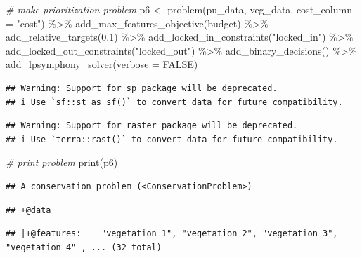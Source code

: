 \documentclass[
  12pt,
]{book}
\newenvironment{Shaded}{\begin{snugshade}}{\end{snugshade}}
\newcommand{\AttributeTok}[1]{\textcolor[rgb]{0.77,0.63,0.00}{#1}}
\newcommand{\CommentTok}[1]{\textcolor[rgb]{0.56,0.35,0.01}{\textit{#1}}}
\newcommand{\ConstantTok}[1]{\textcolor[rgb]{0.00,0.00,0.00}{#1}}
\newcommand{\FloatTok}[1]{\textcolor[rgb]{0.00,0.00,0.81}{#1}}
\newcommand{\FunctionTok}[1]{\textcolor[rgb]{0.00,0.00,0.00}{#1}}
\newcommand{\NormalTok}[1]{#1}
\newcommand{\OtherTok}[1]{\textcolor[rgb]{0.56,0.35,0.01}{#1}}
\newcommand{\SpecialCharTok}[1]{\textcolor[rgb]{0.00,0.00,0.00}{#1}}
\newcommand{\StringTok}[1]{\textcolor[rgb]{0.31,0.60,0.02}{#1}}
\begin{document}
\begin{Shaded}
\begin{Highlighting}[]
\CommentTok{\# make prioritization problem}
\NormalTok{p6 }\OtherTok{\textless{}{-}} \FunctionTok{problem}\NormalTok{(pu\_data, veg\_data, }\AttributeTok{cost\_column =} \StringTok{"cost"}\NormalTok{) }\SpecialCharTok{\%\textgreater{}\%}
      \FunctionTok{add\_max\_features\_objective}\NormalTok{(budget) }\SpecialCharTok{\%\textgreater{}\%}
      \FunctionTok{add\_relative\_targets}\NormalTok{(}\FloatTok{0.1}\NormalTok{) }\SpecialCharTok{\%\textgreater{}\%}
      \FunctionTok{add\_locked\_in\_constraints}\NormalTok{(}\StringTok{"locked\_in"}\NormalTok{) }\SpecialCharTok{\%\textgreater{}\%}
      \FunctionTok{add\_locked\_out\_constraints}\NormalTok{(}\StringTok{"locked\_out"}\NormalTok{) }\SpecialCharTok{\%\textgreater{}\%}
      \FunctionTok{add\_binary\_decisions}\NormalTok{() }\SpecialCharTok{\%\textgreater{}\%}
      \FunctionTok{add\_lpsymphony\_solver}\NormalTok{(}\AttributeTok{verbose =} \ConstantTok{FALSE}\NormalTok{)}
\end{Highlighting}
\end{Shaded}

\begin{verbatim}
## Warning: Support for sp package will be deprecated.
## i Use `sf::st_as_sf()` to convert data for future compatibility.
\end{verbatim}

\begin{verbatim}
## Warning: Support for raster package will be deprecated.
## i Use `terra::rast()` to convert data for future compatibility.
\end{verbatim}

\begin{Shaded}
\begin{Highlighting}[]
\CommentTok{\# print problem}
\FunctionTok{print}\NormalTok{(p6)}
\end{Highlighting}
\end{Shaded}

\begin{verbatim}
## A conservation problem (<ConservationProblem>)
\end{verbatim}

\begin{verbatim}
## +@data
\end{verbatim}

\begin{verbatim}
## |+@features:    "vegetation_1", "vegetation_2", "vegetation_3", "vegetation_4" , ... (32 total)
\end{verbatim}
\end{document}
